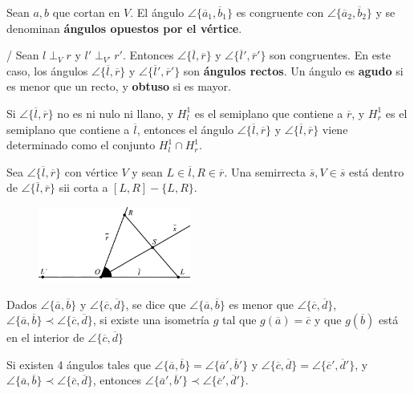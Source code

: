  Sean $a,b$ que cortan en $V$. El ángulo  $\angle \{\overline{a}_1, \overline{b}_1 \}$ es congruente con  $\angle \{\overline{a}_2, \overline{b}_2 \}$ y se denominan \textbf{ángulos opuestos por el vértice}.

/ Sean $l\perp_V r$ y $l'\perp_{V'}r'$. Entonces  $\angle \{\overline{l}, \overline{r} \}$
y $\angle \{\overline{l}', \overline{r}' \}$ son congruentes. En este caso, los ángulos $\angle \{\overline{l}, \overline{r} \}$
y $\angle \{\overline{l}', \overline{r}' \}$ son \textbf{ángulos rectos}.  Un ángulo es \textbf{agudo} si es menor que un recto, y \textbf{obtuso} si es mayor.
	
 Si $\angle \{\overline{l}, \overline{r} \}$ no es ni nulo ni llano, y $H_l^1$ es el semiplano que contiene a $\overline{r}$, y $H^1_r$ es el semiplano que contiene a $\overline{l}$, entonces el ángulo $\angle \{\overline{l}, \overline{r} \}$
y $\angle \{\overline{l}, \overline{r} \}$ viene determinado como el conjunto $H^1_l \cap H^1_r$.


 Sea   $\angle \{\overline{l}, \overline{r} \}$ con vértice $V$ y sean $L \in \overline{l}, R \in \overline{r}$. Una semirrecta $\overline{s}, V \in \overline{s}$ está dentro de  $\angle \{\overline{l}, \overline{r} \}$ sii corta a $[L,R] - \{L,R\}$.

\begin{figure}[H]
	\centering
	\includegraphics[width=5cm]{figuras/4-18.png}
	\vspace{-1em}
\end{figure}

 Dados   $\angle \{\overline{a}, \overline{b} \}$ y  $\angle \{\overline{c}, \overline{d} \}$, se dice que $\angle \{\overline{a}, \overline{b} \}$ es menor que $\angle \{\overline{c}, \overline{d} \}$, $\angle \{\overline{a}, \overline{b} \} \prec \angle \{\overline{c}, \overline{d} \}$, si existe una isometría $g$ tal que $g(\overline{a}) = \overline{c}$ y que $g(\overline{b})$ está en el interior de  $\angle \{\overline{c}, \overline{d} \}$

 Si existen 4 ángulos tales que
 $\angle\{\overline{a}, \overline{b} \} = \angle\{\overline{a}', \overline{b}' \}$ y $\angle\{\overline{c}, \overline{d} \} = \angle\{\overline{c}', \overline{d}' \}$,  y $\angle\{\overline{a}, \overline{b} \} \prec \angle \{\overline{c}, \overline{d} \}$, entonces
$\angle\{\overline{a}', \overline{b}' \} \prec \angle \{\overline{c}', \overline{d}' \}$.

